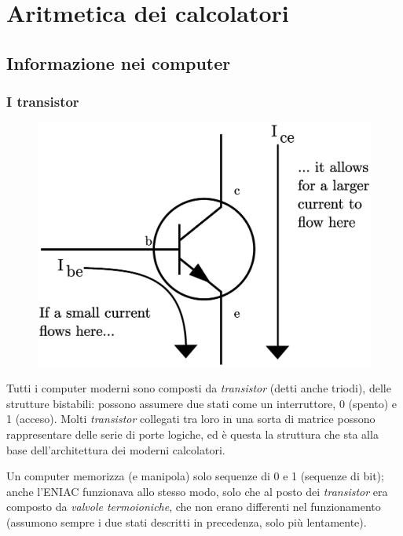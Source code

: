 \documentclass[class=book, crop=false, oneside]{standalone}
\begin{document}
\chapter{Aritmetica dei calcolatori}

\section{Informazione nei computer}

\subsection{I transistor}

\begin{figure}
	\includegraphics[width=\linewidth]{transistor.eps}
	\label{fig:transistor}
	\centering
\end{figure}

Tutti i computer moderni sono composti da \emph{transistor} (detti anche triodi), delle strutture bistabili: possono assumere due stati come un interruttore, 0 (spento) e 1 (acceso). Molti \emph{transistor} collegati tra loro in una sorta di matrice possono rappresentare delle serie di porte logiche, ed è questa la struttura che sta alla base dell'architettura dei moderni calcolatori.

Un computer memorizza (e manipola) solo sequenze di 0 e 1 (sequenze di bit); anche l’ENIAC funzionava allo stesso modo, solo che al posto dei \emph{transistor} era composto da \emph{valvole termoioniche}, che non erano differenti nel funzionamento (assumono sempre i due stati descritti in precedenza, solo più lentamente).
\end{document}
